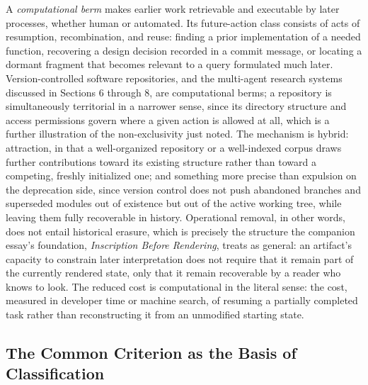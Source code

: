 \documentclass[11pt]{article}
\begin{document}
A \emph{computational berm} makes earlier work retrievable and executable by later processes, whether human or automated. Its future-action class consists of acts of resumption, recombination, and reuse: finding a prior implementation of a needed function, recovering a design decision recorded in a commit message, or locating a dormant fragment that becomes relevant to a query formulated much later. Version-controlled software repositories, and the multi-agent research systems discussed in Sections 6 through 8, are computational berms; a repository is simultaneously territorial in a narrower sense, since its directory structure and access permissions govern where a given action is allowed at all, which is a further illustration of the non-exclusivity just noted. The mechanism is hybrid: attraction, in that a well-organized repository or a well-indexed corpus draws further contributions toward its existing structure rather than toward a competing, freshly initialized one; and something more precise than expulsion on the deprecation side, since version control does not push abandoned branches and superseded modules out of existence but out of the active working tree, while leaving them fully recoverable in history. Operational removal, in other words, does not entail historical erasure, which is precisely the structure the companion essay's foundation, \emph{Inscription Before Rendering}, treats as general: an artifact's capacity to constrain later interpretation does not require that it remain part of the currently rendered state, only that it remain recoverable by a reader who knows to look. The reduced cost is computational in the literal sense: the cost, measured in developer time or machine search, of resuming a partially completed task rather than reconstructing it from an unmodified starting state.

\subsection{The Common Criterion as the Basis of Classification}
\end{document}
